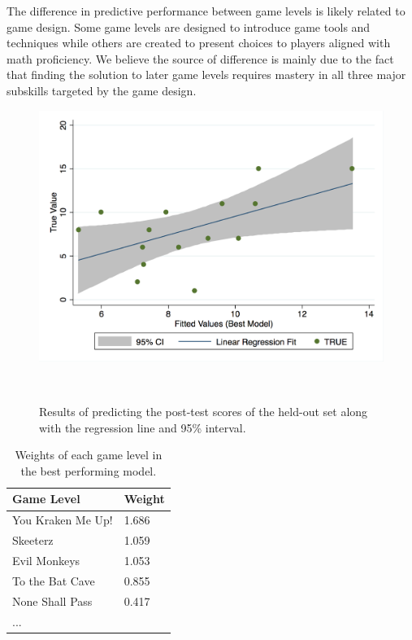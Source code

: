 \documentclass{sigchi}
\begin{document}
	The difference in predictive performance between game levels is likely related to game design. 
	Some game levels are designed to introduce game tools and techniques while others are created to present choices to players aligned with math proficiency.
	We believe the source of difference is mainly due to the fact that finding the solution to later game levels requires mastery in all three major subskills targeted by the game design.	

		
		
	\begin{figure}
		\centering
		\includegraphics[width=0.9\columnwidth]{figures/regression.png}
		\caption{Results of predicting the post-test scores of the held-out set along with the regression line and 95\% interval.}~\label{fig:regression}
	\end{figure}
	
	\begin{table}[ht]
		\centering
		\begin{tabular}{ll}
			\hline
			\textbf{Game Level} & \textbf{Weight} \\ \hline
			You Kraken Me Up!   & 1.686                               \\
			Skeeterz            & 1.059                               \\
			Evil Monkeys        & 1.053                               \\
			To the Bat Cave     & 0.855                               \\
			None Shall Pass     & 0.417                               \\
			...                 &                                    
		\end{tabular}
		\caption{Weights of each game level in the best performing model.}
		\label{tab:regrweights}	
	\end{table}
		
\end{document}
